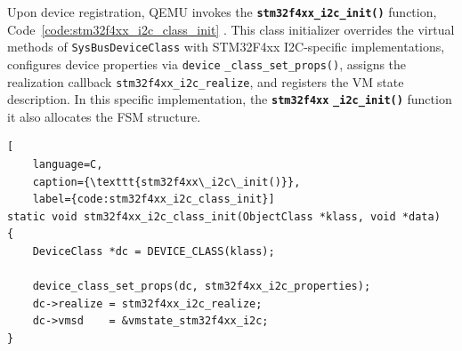Upon device registration, QEMU invokes the \textbf{\texttt{stm32f4xx\_i2c\_init()}} function, Code~\ref{code:stm32f4xx_i2c_class_init} . 
This class initializer overrides the virtual methods of \texttt{SysBusDeviceClass} with 
STM32F4xx I2C-specific implementations, configures device properties via \texttt{device} \texttt{\_class\_set\_props()}, assigns the realization callback \texttt{stm32f4xx\_i2c\_realize}, 
and registers the VM state description. In this specific implementation, the \textbf{\texttt{stm32f4xx}} \textbf{\texttt{\_i2c\_init()}} function it also allocates the FSM structure.
    
\begin{lstlisting}[
    language=C,
    caption={\texttt{stm32f4xx\_i2c\_init()}},
    label={code:stm32f4xx_i2c_class_init}]
static void stm32f4xx_i2c_class_init(ObjectClass *klass, void *data)
{
    DeviceClass *dc = DEVICE_CLASS(klass);

    device_class_set_props(dc, stm32f4xx_i2c_properties);
    dc->realize = stm32f4xx_i2c_realize;
    dc->vmsd    = &vmstate_stm32f4xx_i2c;
}
\end{lstlisting}

